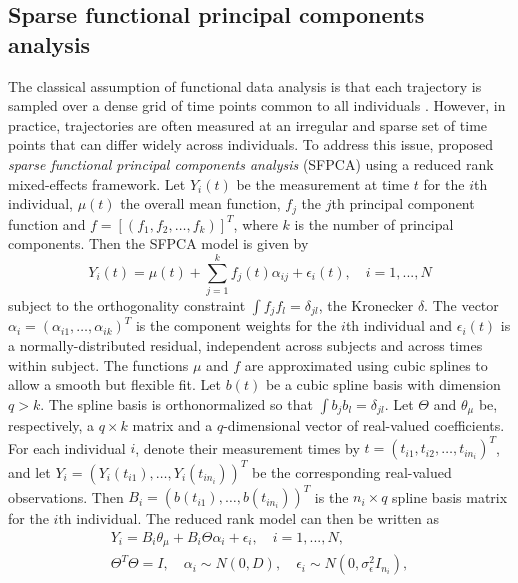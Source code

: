 \documentclass[aoas,preprint]{imsart}
\begin{document}
\subsection{Sparse functional principal components analysis}
The classical assumption of functional data analysis is that each trajectory is sampled over a dense grid of time points common to all individuals \citep{ramsay2007applied}. However, in practice, trajectories are often measured at an irregular and sparse set of time points that can differ widely across individuals. To address this issue, \citet{james2000principal} proposed {\it sparse functional principal components analysis} (SFPCA) using a reduced rank mixed-effects framework. Let $Y_i (t)$ be the measurement at time $t$ for the $i$th individual, $\mu(t)$ the overall mean function, $f_j$ the $j$th principal component function and ${f}= [(f_1,f_2,…,f_k)]^T$, where $k$ is the number of principal components. Then the \citet{james2000principal} SFPCA model is given by 
\begin{equation}
    Y_i(t) = \mu(t) + \sum_{j=1}^{k}f_j(t) \alpha_{ij} + \epsilon_i(t), \quad i = 1, ..., N
\end{equation}
subject to the orthogonality constraint $\int f_j  f_l = \delta_{jl}$, the Kronecker $\delta$. The vector 
$\alpha_i = (\alpha_{i1},\ldots,\alpha_{ik})^T$ is the component weights for the $i$th individual and $\epsilon_i (t)$ is a normally-distributed residual, independent across subjects and across times within subject. The functions $\mu$ and ${f}$ are approximated using cubic splines to allow a smooth but flexible fit. Let $b(t)$ be a cubic spline basis with dimension $q > k$.
The spline basis is orthonormalized so that $\int b_j b_l = \delta_{jl}$.
Let $\Theta$ and $\theta_\mu$ be, respectively, a $q \times k$ matrix and a $q$-dimensional vector of real-valued coefficients. For each individual $i$, denote their measurement times by $t = (t_{i1},t_{i2},…,t_{in_i})^T$, and let  $Y_i= (Y_i (t_{i1}),…,Y_i (t_{in_i }))^T$ be the corresponding real-valued observations. Then $B_i= ( b(t_{i1}),…, b(t_{in_i}))^T$ is the $n_i \times q$ spline basis matrix for the $i$th individual. The reduced rank model can then be written as 
\begin{align}
    Y_i = B_i \theta_\mu + B_i \Theta \alpha_i + \epsilon_i, \quad i = 1, ..., N, \label{eq:fpca} \\
    \Theta^T \Theta = I, \quad \alpha_i \sim N(0, D), \quad \epsilon_i \sim N(0, \sigma_\epsilon^2 I_{n_i}), \nonumber 
\end{align} 
\end{document}
